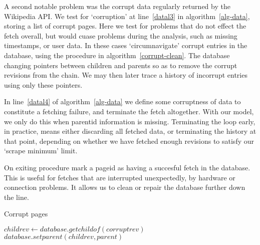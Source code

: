A second notable problem was the corrupt data regularly returned by
the Wikipedia API. We test for `corruption' at line~\ref{datal3} in
algorithm~\ref{alg-data}, storing a list of corrupt pages. Here we test
for problems that do not effect the fetch overall, but would cuase
problems during the analysis, such as missing timestamps, or user
data. In these cases `circumnavigate' corrupt entries in the database,
using the procedure in algorithm~\ref{corrupt-clean}. The database
changing pointers between children and parents so as to remove the
corrupt revisions from the chain. We may then later trace a history of
incorrupt entries using only these pointers.

In line~\ref{datal4} of algorithm~\ref{alg-data} we define some
corruptness of data to constitute a fetching failure, and terminate
the fetch altogether. With our model, we only do this when parentid
information is missing. Terminating the loop early, in practice, means
either discarding all fetched data, or terminating the history at that
point, depending on whether we have fetched enough revisions to
satisfy our `scrape minimum' limit.

On exiting procedure mark a pageid as having a succesful fetch in the
database. This is useful for fetches that are interrupted
unexpectedly, by hardware or connection problems. It allows us to
clean or repair the database further down the line.

\begin{algorithm}
  \caption{Corrupt pages}\label{corrupt-clean}
  \begin{algorithmic}
    \State $childrev \gets database.getchildof(corruptrev)$
    \State $database.setparent(childrev, parent)$ 
    \EndProcedure
  \end{algorithmic}
\end{algorithm}

